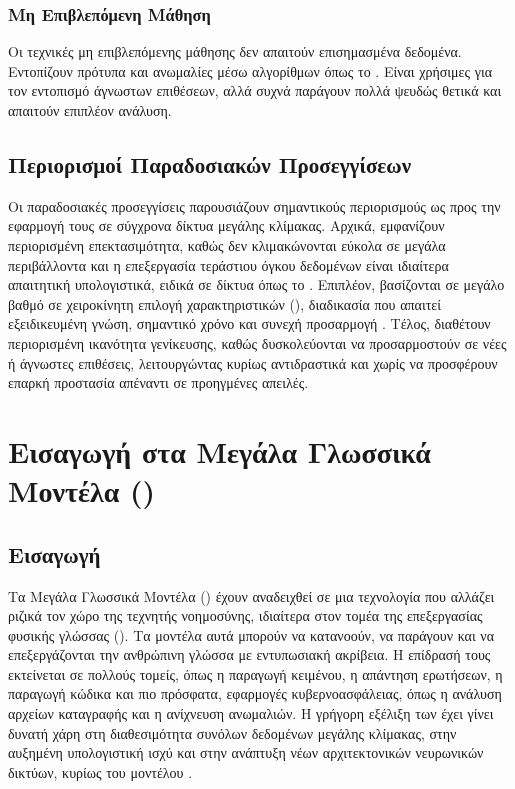 \subsubsection{Μη Επιβλεπόμενη Μάθηση}

Οι τεχνικές μη επιβλεπόμενης μάθησης δεν απαιτούν επισημασμένα δεδομένα. Εντοπίζουν πρότυπα και ανωμαλίες μέσω αλγορίθμων όπως το  \cite{garcia2009anomaly}. Είναι χρήσιμες για τον εντοπισμό άγνωστων επιθέσεων, αλλά συχνά παράγουν πολλά ψευδώς θετικά και απαιτούν επιπλέον ανάλυση.

\subsection{Περιορισμοί Παραδοσιακών Προσεγγίσεων}

Οι παραδοσιακές προσεγγίσεις παρουσιάζουν σημαντικούς περιορισμούς ως προς την εφαρμογή τους σε σύγχρονα δίκτυα μεγάλης κλίμακας. Αρχικά, εμφανίζουν περιορισμένη επεκτασιμότητα, καθώς δεν κλιμακώνονται εύκολα σε μεγάλα περιβάλλοντα και η επεξεργασία τεράστιου όγκου δεδομένων είναι ιδιαίτερα απαιτητική υπολογιστικά, ειδικά σε δίκτυα όπως το . Επιπλέον, βασίζονται σε μεγάλο βαθμό σε χειροκίνητη επιλογή χαρακτηριστικών (), διαδικασία που απαιτεί εξειδικευμένη γνώση, σημαντικό χρόνο και συνεχή προσαρμογή \cite{he2017drain}. Τέλος, διαθέτουν περιορισμένη ικανότητα γενίκευσης, καθώς δυσκολεύονται να προσαρμοστούν σε νέες ή άγνωστες επιθέσεις, λειτουργώντας κυρίως αντιδραστικά και χωρίς να προσφέρουν επαρκή προστασία απέναντι σε προηγμένες απειλές.

\section{Εισαγωγή στα Μεγάλα Γλωσσικά Μοντέλα ()}

\subsection{Εισαγωγή}

Τα Μεγάλα Γλωσσικά Μοντέλα () έχουν αναδειχθεί σε μια τεχνολογία που αλλάζει ριζικά τον χώρο της τεχνητής νοημοσύνης, ιδιαίτερα στον τομέα της επεξεργασίας φυσικής γλώσσας (). Τα μοντέλα αυτά μπορούν να κατανοούν, να παράγουν και να επεξεργάζονται την ανθρώπινη γλώσσα με εντυπωσιακή ακρίβεια. Η επίδρασή τους εκτείνεται σε πολλούς τομείς, όπως η παραγωγή κειμένου, η απάντηση ερωτήσεων, η παραγωγή κώδικα και πιο πρόσφατα, εφαρμογές κυβερνοασφάλειας, όπως η ανάλυση αρχείων καταγραφής και η ανίχνευση ανωμαλιών. Η γρήγορη εξέλιξη των  έχει γίνει δυνατή χάρη στη διαθεσιμότητα συνόλων δεδομένων μεγάλης κλίμακας, στην αυξημένη υπολογιστική ισχύ και στην ανάπτυξη νέων αρχιτεκτονικών νευρωνικών δικτύων, κυρίως του μοντέλου  \cite{vaswani2017attention}.

